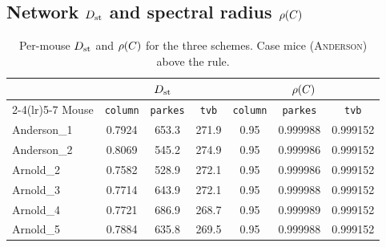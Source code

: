 \subsection{Network \texorpdfstring{$D_{\mathrm{st}}$}{Dst} and spectral radius \texorpdfstring{$\rho(C)$}{rho(C)}}
\begin{table}[H]\centering\small
\caption{Per-mouse $D_{\mathrm{st}}$ and $\rho(C)$ for the three schemes. Case mice (\textsc{Anderson}) above the rule.}
\begin{tabular}{@{}l ccc ccc@{}}\toprule
& \multicolumn{3}{c}{$D_{\mathrm{st}}$} & \multicolumn{3}{c}{$\rho(C)$} \\
\cmidrule(lr){2-4}\cmidrule(lr){5-7}
Mouse & \texttt{column} & \texttt{parkes} & \texttt{tvb} & \texttt{column} & \texttt{parkes} & \texttt{tvb} \\\midrule
Anderson\_1 & 0.7924 & 653.3 & 271.9 & 0.95 & 0.999988 & 0.999152 \\
Anderson\_2 & 0.8069 & 545.2 & 274.9 & 0.95 & 0.999986 & 0.999152 \\
\midrule
Arnold\_2 & 0.7582 & 528.9 & 272.1 & 0.95 & 0.999986 & 0.999152 \\
Arnold\_3 & 0.7714 & 643.9 & 272.1 & 0.95 & 0.999988 & 0.999152 \\
Arnold\_4 & 0.7721 & 686.9 & 268.7 & 0.95 & 0.999989 & 0.999152 \\
Arnold\_5 & 0.7884 & 635.8 & 269.5 & 0.95 & 0.999988 & 0.999152 \\
\bottomrule\end{tabular}\end{table}

